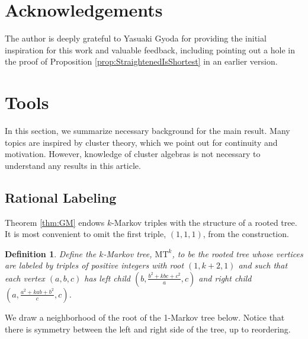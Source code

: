 \documentclass[12pt, letterpaper,table]{amsart}
\newtheorem{definition}[theorem]{Definition}
\theoremstyle{remark}
\begin{document}
\section*{Acknowledgements}

The author is deeply grateful to Yasuaki Gyoda for providing the initial inspiration for this work and valuable feedback, including pointing out a hole in the proof of Proposition \ref{prop:StraightenedIsShortest} in an earlier version.

\section{Tools}\label{sec:Tools}

In this section, we summarize necessary background for the main result. Many topics are inspired by cluster theory, which we point out for continuity and motivation. However, knowledge of cluster algebras is not necessary to understand any results in this article.

\subsection{Rational Labeling}\label{sec:RationalLabeing}

Theorem \ref{thm:GM} endows $k$-Markov triples with the structure of a rooted tree. It is most convenient to omit the first triple, $(1,1,1)$, from the construction.

\begin{definition}
Define the \emph{$k$-Markov tree}, $\mathrm{MT}^k$, to be the rooted tree whose vertices are labeled by triples of positive integers with root $(1,k+2,1)$ and such that each vertex $(a,b,c)$ has left child $(b,\frac{b^2 + kbc + c^2}{a},c)$ and right child $(a, \frac{a^2 + kab + b^2}{c},c)$.

\end{definition}

  We draw a neighborhood of the root of the 1-Markov tree below. Notice that there is symmetry between the left and right side of the tree, up to reordering.
\end{document}
